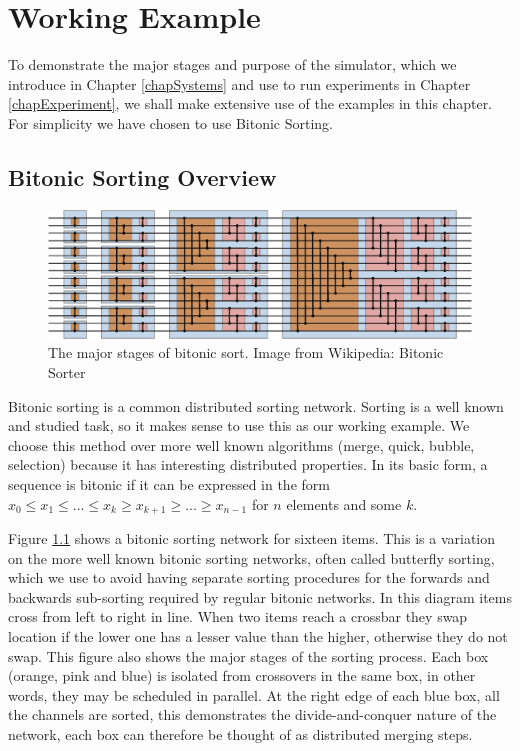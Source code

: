 \chapter{Working Example}
\label{chapExample}

To demonstrate the major stages and purpose of the simulator, which we introduce in Chapter \ref{chapSystems} and use to run experiments in Chapter \ref{chapExperiment}, we shall make extensive use of the examples in this chapter.
For simplicity we have chosen to use Bitonic Sorting.

\section{Bitonic Sorting Overview}

\begin{figure}
\begin{center}
	\includegraphics[width=12cm]{figures/egBitonicSort.eps}
\caption{The major stages of bitonic sort.  Image from Wikipedia: Bitonic Sorter}
\label{figBitonicNormal}
\end{center}
\end{figure}

Bitonic sorting is a common distributed sorting network.
Sorting is a well known and studied task, so it makes sense to use this as our working example.
We choose this method over more well known algorithms (merge, quick, bubble, selection) because it has interesting distributed properties.
In its basic form, a sequence is bitonic if it can be expressed in the form $x_0 \leq x_1 \leq ... \leq x_k \geq x_{k+1} \geq ... \geq x_{n-1}$ for $n$ elements and some $k$.

Figure \ref{figBitonicNormal} shows a bitonic sorting network for sixteen items.
This is a variation on the more well known bitonic sorting networks, often called butterfly sorting, which we use to avoid having separate sorting procedures for the forwards and backwards sub-sorting required by regular bitonic networks.
In this diagram items cross from left to right in line.
When two items reach a crossbar they swap location if the lower one has a lesser value than the higher, otherwise they do not swap.
This figure also shows the major stages of the sorting process.
Each box (orange, pink and blue) is isolated from crossovers in the same box, in other words, they may be scheduled in parallel.
At the right edge of each blue box, all the channels are sorted, this demonstrates the divide-and-conquer nature of the network, each box can therefore be thought of as distributed merging steps.

